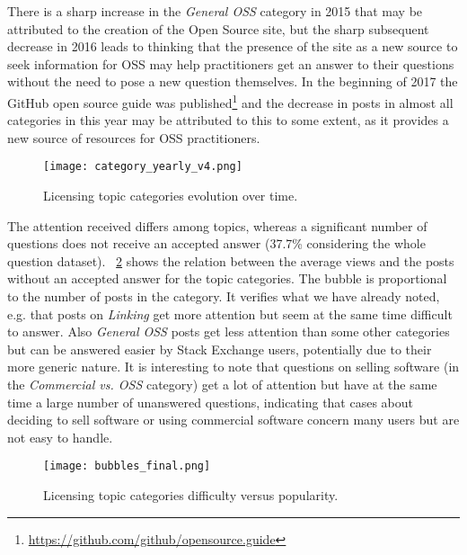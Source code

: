 \documentclass{elsarticle}
\begin{document}
There is a sharp increase in the \emph{General OSS} category in 2015 that may be attributed to the creation of the Open Source site, but the sharp subsequent decrease in 2016 leads to thinking that the presence of the site as a new source to seek information for OSS may help practitioners get an answer to their questions without the need to pose a new question themselves. In the beginning of 2017 the GitHub open source guide was published\footnote{\url{https://github.com/github/opensource.guide}} and the decrease in posts in almost all categories in this year may be attributed to this to some extent, as it provides a new source of resources for OSS practitioners. 

\begin{figure}[!t]
\centering
\texttt{[image: category\_yearly\_v4.png]}
\caption{Licensing topic categories evolution over time.}
\label{fig:mean-answers-per-license}
\end{figure}

The attention received differs among topics, whereas a significant number of questions does not receive an accepted answer (37.7\% considering the whole question dataset). \figurename~\ref{fig:bubble-plot} shows the relation between the average views and the posts without an accepted answer for the topic categories. The bubble is proportional to the number of posts in the category. It verifies what we have already noted, e.g. that posts on \emph{Linking} get more attention but seem at the same time difficult to answer. Also \emph{General OSS} posts get less attention than some other categories but can be answered easier by Stack Exchange users, potentially due to their more generic nature. It is interesting to note that questions on selling software (in the \emph{Commercial vs. OSS} category) get a lot of attention but have at the same time a large number of unanswered questions, indicating that cases about deciding to sell software or using commercial software concern many users but are not easy to handle.     

\begin{figure}[!t]
\centering
\texttt{[image: bubbles\_final.png]}
\caption{Licensing topic categories difficulty versus popularity.}
\label{fig:bubble-plot}
\end{figure}

\noindent{}
\end{document}
